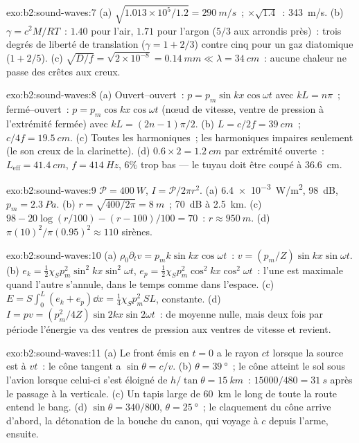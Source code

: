 \begin{solution}{exo:b2:sound-waves:7}
(a) $\sqrt{1.013 \times 10^5/1.2} = \qty{290}{m/s}$~; $\times\sqrt{1.4}$~: \qty{343}{m/s}. (b)
$\gamma = c^2M/RT$~: $1.40$ pour l'air, $1.71$ pour l'argon ($5/3$ aux arrondis près)~:
trois degrés de liberté de translation ($\gamma = 1 + 2/3$) contre cinq pour
un gaz diatomique ($1 + 2/5$). (c) $\sqrt{D/f} = \sqrt{2 \times 10^{-8}} = \qty{0.14}{mm}
\ll \lambda = \qty{34}{cm}$~: aucune chaleur ne passe des crêtes aux creux.
\end{solution}

\begin{solution}{exo:b2:sound-waves:8}
(a) Ouvert--ouvert~: $p = p_m\sin kx\cos\omega t$ avec $kL = n\pi$~; fermé--ouvert~:
$p = p_m\cos kx\cos\omega t$ (nœud de vitesse, ventre de pression à l'extrémité
fermée) avec $kL = (2n - 1)\pi/2$. (b) $L = c/2f = \qty{39}{cm}$~; $c/4f = \qty{19.5}{cm}$.
(c) Toutes les harmoniques~; les harmoniques impaires seulement (le son creux de la clarinette).
(d) $0.6 \times 2 = \qty{1.2}{cm}$ par extrémité ouverte~: $L_{\text{eff}} = \qty{41.4}{cm}$, $f =
\qty{414}{Hz}$, $6\%$ trop bas --- le tuyau doit être coupé à \qty{36.6}{cm}.
\end{solution}

\begin{solution}{exo:b2:sound-waves:9}
$\mathcal P = \qty{400}{W}$, $I = \mathcal P/2\pi r^2$. (a) \qty{6.4e-3}{W/m^2}, \qty{98}{dB},
$p_m = \qty{2.3}{Pa}$. (b) $r = \sqrt{400/2\pi} = \qty{8}{m}$~; \qty{70}{dB} à \qty{2.5}{km}.
(c) $98 - 20\log(r/100) - (r - 100)/100 = 70$~: $r \approx \qty{950}{m}$. (d)
$\pi(10)^2/\pi(0.95)^2 \approx 110$ sirènes.
\end{solution}

\begin{solution}{exo:b2:sound-waves:10}
(a) $\rho_0\partial_tv = p_mk\sin kx\cos\omega t$~: $v = (p_m/Z)\sin kx\sin\omega t$. (b)
$e_k = \tfrac12\chi_Sp_m^2\sin^2kx\sin^2\omega t$, $e_p = \tfrac12\chi_Sp_m^2\cos^2kx\cos^2\omega t$~:
l'une est maximale quand l'autre s'annule, dans le temps comme dans l'espace. (c) $E =
S\int_0^L(e_k + e_p)\dd x = \tfrac14\chi_Sp_m^2SL$, constante. (d) $I = pv =
(p_m^2/4Z)\sin2kx\sin2\omega t$~: de moyenne nulle, mais deux fois par période l'énergie
va des ventres de pression aux ventres de vitesse et revient.
\end{solution}

\begin{solution}{exo:b2:sound-waves:11}
(a) Le front émis en $t = 0$ a le rayon $ct$ lorsque la source est à $vt$~:
le cône tangent a $\sin\theta = c/v$. (b) $\theta = \qty{39}{\degree}$~; le cône
atteint le sol sous l'avion lorsque celui-ci s'est éloigné de $h/\tan\theta = \qty{15}{km}$~:
$15000/480 = \qty{31}{s}$ après le passage à la verticale. (c) Un
tapis large de \qty{60}{km} le long de toute la route entend le bang. (d) $\sin\theta
= 340/800$, $\theta = \qty{25}{\degree}$~; le claquement du cône arrive d'abord, la
détonation de la bouche du canon, qui voyage à $c$ depuis l'arme, ensuite.
\end{solution}

